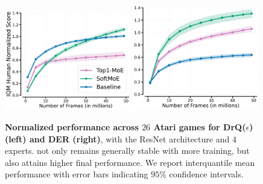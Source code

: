 \begin{figure}[!h]
    \centering
    \includegraphics[width=0.49\textwidth]{figures/DrQ_eps_8CORRCOLOR.pdf}%
    \includegraphics[width=0.49\textwidth]{figures/DER_8CORRCOLOR.pdf}%
    \caption{\textbf{Normalized performance across $26$ Atari games for DrQ($\epsilon$) (left) and DER (right)}, with the ResNet architecture \citep{espeholt2018impala} and $4$ experts. \softmoe{} not only remains generally stable with more training, but also attains higher final performance. We report interquantile mean performance with error bars indicating $95\%$ confidence intervals.}
    \label{fig:samplefficiency_4experts}
    \vspace{-0.2cm}
\end{figure}
    
